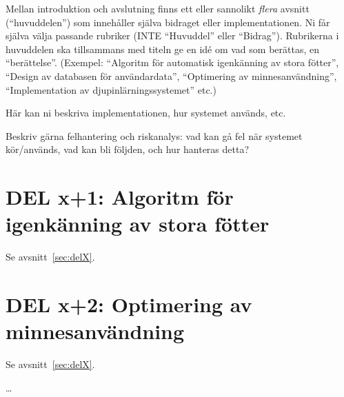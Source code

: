 \label{sec:delX}
Mellan introduktion och avslutning finns ett eller sannolikt \emph{flera} avsnitt (``huvuddelen'') som innehåller själva bidraget eller implementationen.
Ni får själva välja passande rubriker (INTE ``Huvuddel'' eller ``Bidrag'').  Rubrikerna i huvuddelen ska tillsammans med titeln ge en idé om vad som berättas, en ``berättelse''. (Exempel: ``Algoritm för automatisk igenkänning av stora fötter'', ``Design av databasen för användardata'', ``Optimering av minnesanvändning'', ``Implementation av djup\-in\-lär\-nings\-sys\-te\-met'' etc.)

Här kan ni beskriva implementationen, hur systemet används, etc.

Beskriv gärna felhantering och riskanalys: vad kan gå fel när systemet kör/används, vad kan bli följden, och hur hanteras detta?

\section{DEL x+1: Algoritm för igenkänning av stora fötter}
Se avsnitt~\ref{sec:delX}.
\section{DEL x+2: Optimering av minnesanvändning}
Se avsnitt~\ref{sec:delX}.

\ldots
